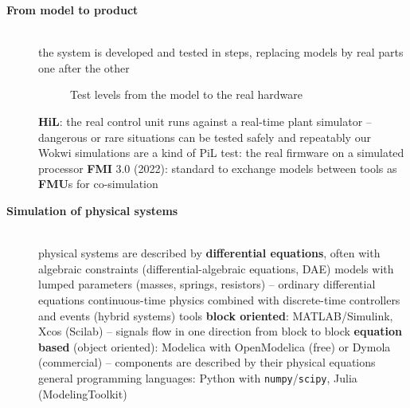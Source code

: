 \begin{description}
\item[{\rot\bf From model to product}]~\\[-\lblskip]
\bi
	\ite the system is developed and tested in steps, replacing models by real parts one after the other
\ei
\begin{figure}[!hbtp]
\begin{center}
\caption{Test levels from the model to the real hardware}
\end{center}
\end{figure}
\bi
	\ite \textbf{HiL}: the real control unit runs against a real-time plant simulator -- dangerous or rare situations can be tested safely and repeatably
	\ite our Wokwi simulations are a kind of PiL test: the real firmware on a simulated processor
	\ite \textbf{FMI} 3.0 (2022): standard to exchange models between tools as \textbf{FMU}s for co-simulation
\ei
\os{\newpage}

\item[{\rot\bf Simulation of physical systems}]~\\[-\lblskip]
\bi
	\ite physical systems are described by \textbf{differential equations}, often with algebraic constraints (differential-algebraic equations, DAE)
	\ite models with lumped parameters (masses, springs, resistors) -- ordinary differential equations
	\ite continuous-time physics combined with discrete-time controllers and events (hybrid systems)
	\ite tools
	\bi
		\ite \textbf{block oriented}: MATLAB/Simulink, Xcos (Scilab) -- signals flow in one direction from block to block
		\ite \textbf{equation based} (object oriented): Modelica with OpenModelica (free) or Dymola (commercial) -- components are described by their physical equations
		\ite general programming languages: Python with \texttt{numpy}/\texttt{scipy}, Julia (ModelingToolkit)
	\ei
\ei
\os{\newpage}


\end{description}
